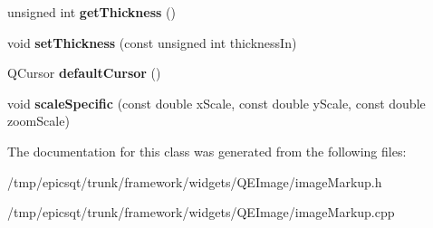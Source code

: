 \begin{DoxyCompactItemize}
\item 
\hypertarget{classmarkupBeam_adb29c80ace917570145becb4bea2db71}{
unsigned int {\bfseries getThickness} ()}
\label{classmarkupBeam_adb29c80ace917570145becb4bea2db71}

\item 
\hypertarget{classmarkupBeam_ac5c6ac4426fc7ddf03d712d0b23d6561}{
void {\bfseries setThickness} (const unsigned int thicknessIn)}
\label{classmarkupBeam_ac5c6ac4426fc7ddf03d712d0b23d6561}

\item 
\hypertarget{classmarkupBeam_a674790f9bd7d317245567c95bcc446f1}{
QCursor {\bfseries defaultCursor} ()}
\label{classmarkupBeam_a674790f9bd7d317245567c95bcc446f1}

\item 
\hypertarget{classmarkupBeam_a029a5141fc340d89d0f1ae9b53c1b64f}{
void {\bfseries scaleSpecific} (const double xScale, const double yScale, const double zoomScale)}
\label{classmarkupBeam_a029a5141fc340d89d0f1ae9b53c1b64f}

\end{DoxyCompactItemize}


The documentation for this class was generated from the following files:\begin{DoxyCompactItemize}
\item 
/tmp/epicsqt/trunk/framework/widgets/QEImage/imageMarkup.h\item 
/tmp/epicsqt/trunk/framework/widgets/QEImage/imageMarkup.cpp\end{DoxyCompactItemize}
